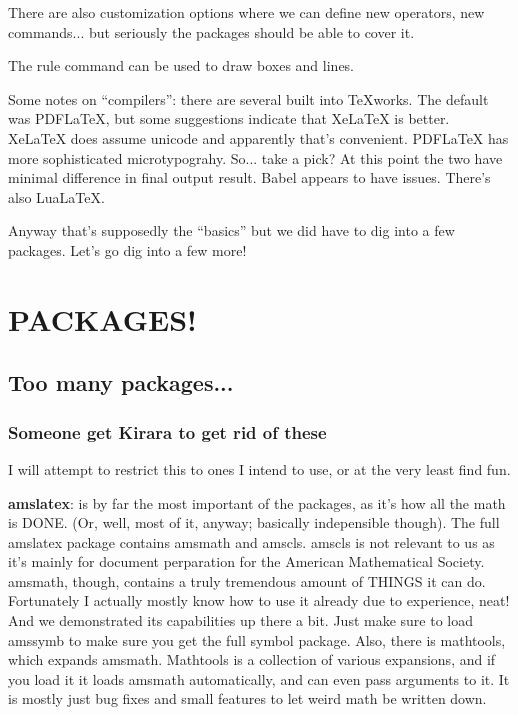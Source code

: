 \documentclass{article}
\begin{document}
There are also customization options where we can define new operators, new commands... but seriously the packages should be able to cover it. 

The rule command can be used to draw boxes and lines.  

Some notes on ``compilers'': there are several built into TeXworks. The default was PDFLaTeX, but some suggestions  indicate that XeLaTeX is better. XeLaTeX does assume unicode and apparently that's convenient. PDFLaTeX has more sophisticated microtypograhy. So... take a pick? At this point the two have minimal difference in final output result. Babel appears to have issues. There's also LuaLaTeX. 

Anyway that's supposedly the ``basics'' but we did have to dig into a few packages. Let's go dig into a few more!

\section{PACKAGES!}
\subsection{Too many packages...}
\subsubsection{Someone get Kirara to get rid of these}

I will attempt to restrict this to ones I intend to use, or at the very least find fun.

\textbf{amslatex}: is by far the most important of the packages, as it's how all the math is DONE. (Or, well, most of it, anyway; basically indepensible though). The full amslatex package contains amsmath and amscls. amscls is not relevant to us as it's mainly for document perparation for the American Mathematical Society. amsmath, though, contains a truly tremendous amount of THINGS it can do. Fortunately I actually mostly know how to use it already due to experience, neat! And we demonstrated its capabilities up there a bit. Just make sure to load amssymb to make sure you get the full symbol package. Also, there is mathtools, which expands amsmath. Mathtools is a collection of various expansions, and if you load it it loads amsmath automatically, and can even pass arguments to it. It is mostly just bug fixes and small features to let weird math be written down. 
\end{document}

